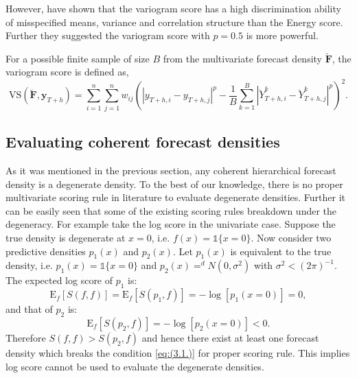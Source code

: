 \documentclass[a4paper, 11pt]{article}
\def\E{\text{E}}
\begin{document}
However, \citet{SCHEUERER2015} have shown that the variogram score has a high discrimination ability of misspecified means, variance and correlation structure than the Energy score. Further they suggested the variogram score with $p=0.5$ is more powerful.

For a possible finite sample of size $B$ from the multivariate forecast density $\breve{\bm{F}}$, the variogram score is defined as,
\begin{equation}
\text{VS}(\breve{\bm{F}}, \bm{y}_{T+h}) = \displaystyle\sum_{i=1}^{n}\displaystyle\sum_{j=1}^{n}w_{ij}\left(|y_{T+h,i} - y_{T+h,j}|^p - \frac{1}{B} \displaystyle\sum_{k=1}^{B} |\breve{Y}^k_{T+h,i}-\breve{Y}^k_{T+h,j}|^p\right)^2.
\end{equation}




%

\subsection{Evaluating coherent forecast densities}

As it was mentioned in the previous section, any coherent hierarchical forecast density is a degenerate density. To the best of our knowledge, there is no proper multivariate scoring rule in literature to evaluate degenerate densities. Further it can be easily seen that some of the existing scoring rules breakdown under the degeneracy. For example take the log score in the univariate case. Suppose the true density is degenerate at $x=0$, i.e. $f(x)=\mathbb{1}\{x=0\}$.  Now consider two predictive densities $p_1(x)$ and $p_2(x)$. Let $p_1(x)$ is equivalent to the true density, i.e. $p_1(x)=\mathbb{1}\{x=0\}$ and $p_2(x) =^d N(0,\sigma^2)$ with $\sigma^2 < (2\pi)^{-1}$. The expected log score of $p_1$ is:
$$
\E_f[S(f,f)] = \E_f[S(p_1,f)] = -\log[p_1(x=0)]=0,
$$
and that of $p_2$ is:
$$
\E_f[S(p_2,f)] = -\log[p_2(x=0)]<0.
$$
Therefore $S(f,f) > S(p_2,f)$ and hence there exist at least one forecast density which breaks the condition \eqref{eq:(3.1.)} for proper scoring rule. This implies log score cannot be used to evaluate the degenerate densities.
\end{document}
